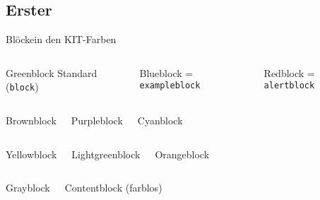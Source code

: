 \documentclass{sdqbeamer}
\begin{document}
\subsection{Erster }
\begin{frame}{Blöcke}{in den KIT-Farben}
  \begin{columns}
    \begin{greenblock}{Greenblock}
      Standard (\texttt{block})
        \end{greenblock}
    \begin{blueblock}{Blueblock}
      = \texttt{exampleblock}
        \end{blueblock}
    \begin{redblock}{Redblock}
      = \texttt{alertblock}
        \end{redblock}
  \end{columns}
  \begin{columns}
        \begin{brownblock}{Brownblock}
        \end{brownblock}
        \begin{purpleblock}{Purpleblock}
        \end{purpleblock}
        \begin{cyanblock}{Cyanblock}
        \end{cyanblock}
  \end{columns}
  \begin{columns}
        \begin{yellowblock}{Yellowblock}
        \end{yellowblock}
        \begin{lightgreenblock}{Lightgreenblock}
        \end{lightgreenblock}
        \begin{orangeblock}{Orangeblock}
        \end{orangeblock}
  \end{columns}
  \begin{columns}
        \begin{grayblock}{Grayblock}
        \end{grayblock}
    \begin{contentblock}{Contentblock}
      (farblos)
    \end{contentblock}
  \end{columns}
\end{frame}
    
\end{document}

